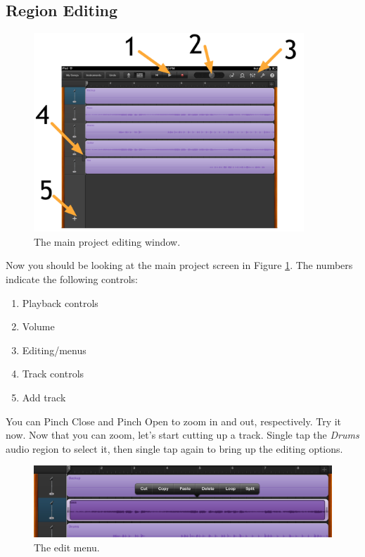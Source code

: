 \documentclass[12pt]{article}
\begin{document}
\subsection{Region Editing}
\begin{figure}[h]
   \centering
   \includegraphics[width=4in]{fig/main.png}  
   \caption{The main project editing window.\label{fig:main}}
\end{figure}

Now you should be looking at the main project screen in Figure \ref{fig:main}. The numbers indicate the following controls:
\begin{enumerate}
   \item Playback controls
   \item Volume
   \item Editing/menus
   \item Track controls
   \item Add track
\end{enumerate}
\pagebreak
You can Pinch Close and Pinch Open to zoom in and out, respectively. Try it now. Now that you can zoom, let's start cutting up a track. Single tap the \emph{Drums} audio region to select it, then single tap again to bring up the editing options. 
\begin{figure}[h!]
   \centering
   \includegraphics[width=5in]{fig/step1.png}  
   \caption*{The edit menu.\label{fig:edit}}
\end{figure}
\end{document}

